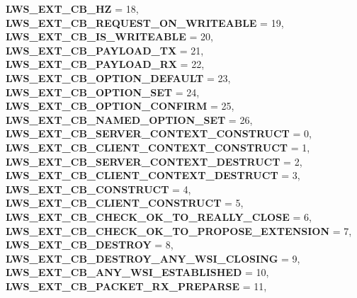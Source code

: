 \begin{DoxyCompactItemize}
\newline
{\bfseries L\+W\+S\+\_\+\+E\+X\+T\+\_\+\+C\+B\+\_\+HZ} = 18, 
{\bfseries L\+W\+S\+\_\+\+E\+X\+T\+\_\+\+C\+B\+\_\+\+R\+E\+Q\+U\+E\+S\+T\+\_\+\+O\+N\+\_\+\+W\+R\+I\+T\+E\+A\+B\+LE} = 19, 
{\bfseries L\+W\+S\+\_\+\+E\+X\+T\+\_\+\+C\+B\+\_\+\+I\+S\+\_\+\+W\+R\+I\+T\+E\+A\+B\+LE} = 20, 
{\bfseries L\+W\+S\+\_\+\+E\+X\+T\+\_\+\+C\+B\+\_\+\+P\+A\+Y\+L\+O\+A\+D\+\_\+\+TX} = 21, 
\newline
{\bfseries L\+W\+S\+\_\+\+E\+X\+T\+\_\+\+C\+B\+\_\+\+P\+A\+Y\+L\+O\+A\+D\+\_\+\+RX} = 22, 
{\bfseries L\+W\+S\+\_\+\+E\+X\+T\+\_\+\+C\+B\+\_\+\+O\+P\+T\+I\+O\+N\+\_\+\+D\+E\+F\+A\+U\+LT} = 23, 
{\bfseries L\+W\+S\+\_\+\+E\+X\+T\+\_\+\+C\+B\+\_\+\+O\+P\+T\+I\+O\+N\+\_\+\+S\+ET} = 24, 
{\bfseries L\+W\+S\+\_\+\+E\+X\+T\+\_\+\+C\+B\+\_\+\+O\+P\+T\+I\+O\+N\+\_\+\+C\+O\+N\+F\+I\+RM} = 25, 
\newline
{\bfseries L\+W\+S\+\_\+\+E\+X\+T\+\_\+\+C\+B\+\_\+\+N\+A\+M\+E\+D\+\_\+\+O\+P\+T\+I\+O\+N\+\_\+\+S\+ET} = 26, 
{\bfseries L\+W\+S\+\_\+\+E\+X\+T\+\_\+\+C\+B\+\_\+\+S\+E\+R\+V\+E\+R\+\_\+\+C\+O\+N\+T\+E\+X\+T\+\_\+\+C\+O\+N\+S\+T\+R\+U\+CT} = 0, 
{\bfseries L\+W\+S\+\_\+\+E\+X\+T\+\_\+\+C\+B\+\_\+\+C\+L\+I\+E\+N\+T\+\_\+\+C\+O\+N\+T\+E\+X\+T\+\_\+\+C\+O\+N\+S\+T\+R\+U\+CT} = 1, 
{\bfseries L\+W\+S\+\_\+\+E\+X\+T\+\_\+\+C\+B\+\_\+\+S\+E\+R\+V\+E\+R\+\_\+\+C\+O\+N\+T\+E\+X\+T\+\_\+\+D\+E\+S\+T\+R\+U\+CT} = 2, 
\newline
{\bfseries L\+W\+S\+\_\+\+E\+X\+T\+\_\+\+C\+B\+\_\+\+C\+L\+I\+E\+N\+T\+\_\+\+C\+O\+N\+T\+E\+X\+T\+\_\+\+D\+E\+S\+T\+R\+U\+CT} = 3, 
{\bfseries L\+W\+S\+\_\+\+E\+X\+T\+\_\+\+C\+B\+\_\+\+C\+O\+N\+S\+T\+R\+U\+CT} = 4, 
{\bfseries L\+W\+S\+\_\+\+E\+X\+T\+\_\+\+C\+B\+\_\+\+C\+L\+I\+E\+N\+T\+\_\+\+C\+O\+N\+S\+T\+R\+U\+CT} = 5, 
{\bfseries L\+W\+S\+\_\+\+E\+X\+T\+\_\+\+C\+B\+\_\+\+C\+H\+E\+C\+K\+\_\+\+O\+K\+\_\+\+T\+O\+\_\+\+R\+E\+A\+L\+L\+Y\+\_\+\+C\+L\+O\+SE} = 6, 
\newline
{\bfseries L\+W\+S\+\_\+\+E\+X\+T\+\_\+\+C\+B\+\_\+\+C\+H\+E\+C\+K\+\_\+\+O\+K\+\_\+\+T\+O\+\_\+\+P\+R\+O\+P\+O\+S\+E\+\_\+\+E\+X\+T\+E\+N\+S\+I\+ON} = 7, 
{\bfseries L\+W\+S\+\_\+\+E\+X\+T\+\_\+\+C\+B\+\_\+\+D\+E\+S\+T\+R\+OY} = 8, 
{\bfseries L\+W\+S\+\_\+\+E\+X\+T\+\_\+\+C\+B\+\_\+\+D\+E\+S\+T\+R\+O\+Y\+\_\+\+A\+N\+Y\+\_\+\+W\+S\+I\+\_\+\+C\+L\+O\+S\+I\+NG} = 9, 
{\bfseries L\+W\+S\+\_\+\+E\+X\+T\+\_\+\+C\+B\+\_\+\+A\+N\+Y\+\_\+\+W\+S\+I\+\_\+\+E\+S\+T\+A\+B\+L\+I\+S\+H\+ED} = 10, 
\newline
{\bfseries L\+W\+S\+\_\+\+E\+X\+T\+\_\+\+C\+B\+\_\+\+P\+A\+C\+K\+E\+T\+\_\+\+R\+X\+\_\+\+P\+R\+E\+P\+A\+R\+SE} = 11, 

\end{DoxyCompactItemize}
